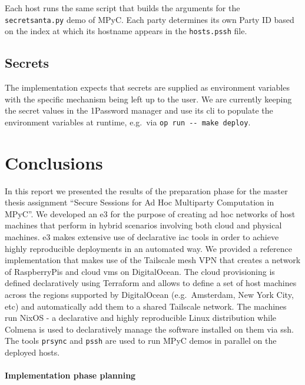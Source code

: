\documentclass[
]{article}
\begin{document}
Each host runs the same script that builds the arguments for the
\texttt{secretsanta.py} demo of MPyC. Each party determines its own
Party ID based on the index at which its hostname appears in the
\texttt{hosts.pssh} file.

\hypertarget{secrets}{%
  \subsection{Secrets}\label{secrets}}

The implementation expects that secrets are supplied as environment
variables with the specific mechanism being left up to the user. We are
currently keeping the secret values in the 1Password manager and use its
\gls{cli} to populate the environment variables at runtime, e.g.~via
\texttt{op\ run\ -\/-\ make\ deploy}.

\hypertarget{conclusions}{%
  \section{Conclusions}\label{conclusions}}

In this report we presented the results of the preparation phase for the
master thesis assignment ``Secure Sessions for Ad Hoc Multiparty
Computation in MPyC''. We developed an \acrfull{e3} for the purpose of
creating ad hoc networks of host machines that perform 
in hybrid scenarios involving both cloud and physical machines. \gls{e3}
makes extensive use of declarative \gls{iac} tools in order to achieve
highly reproducible deployments in an automated way. We provided a
reference implementation that makes use of the Tailscale mesh VPN that
creates a network of RaspberryPis and cloud \glspl{vm} on DigitalOcean.
The cloud provisioning is defined declaratively using Terraform and
allows to define a set of host machines across the regions supported by
DigitalOcean (e.g.~Amsterdam, New York City, etc) and automatically add
them to a shared Tailscale network. The machines run NixOS - a
declarative and highly reproducible Linux distribution while Colmena is
used to declaratively manage the software installed on them via
\gls{ssh}. The tools \texttt{prsync} and \texttt{pssh} are used to run
MPyC demos in parallel on the deployed hosts.

\hypertarget{implementation-phase-planning}{%
  \paragraph{Implementation phase
    planning}\label{implementation-phase-planning}}
\end{document}
